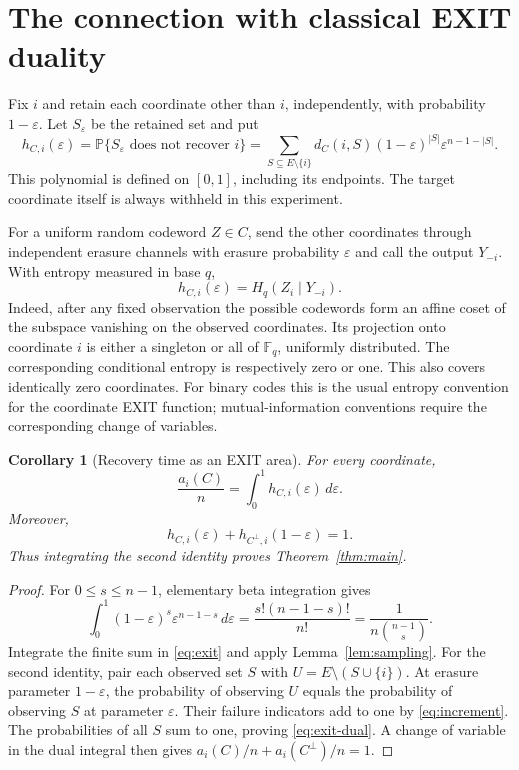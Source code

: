 \documentclass[11pt]{article}
\newtheorem{corollary}[theorem]{Corollary}
\theoremstyle{remark}
\newcommand{\F}{\mathbb F}
\newcommand{\Prob}{\mathbb P}
\begin{document}
\section{The connection with classical EXIT duality}\label{sec:exit}
Fix $i$ and retain each coordinate other than $i$, independently, with
probability $1-\varepsilon$. Let $S_\varepsilon$ be the retained set and put
\begin{equation}\label{eq:exit}
 h_{C,i}(\varepsilon)
 =\Prob\{S_\varepsilon\text{ does not recover }i\}
 =\sum_{S\subseteq E\setminus\{i\}}
 d_C(i,S)(1-\varepsilon)^{|S|}\varepsilon^{n-1-|S|}.
\end{equation}
This polynomial is defined on $[0,1]$, including its endpoints. The target
coordinate itself is always withheld in this experiment.

For a uniform random codeword $Z\in C$, send the other coordinates through
independent erasure channels with erasure probability $\varepsilon$ and
call the output $Y_{-i}$. With entropy measured in base $q$,
\[
                 h_{C,i}(\varepsilon)=H_q(Z_i\mid Y_{-i}).
\]
Indeed, after any fixed observation the possible codewords form an affine
coset of the subspace vanishing on the observed coordinates. Its projection
onto coordinate $i$ is either a singleton or all of $\F_q$, uniformly
distributed. The corresponding conditional entropy is respectively zero
or one. This also covers identically zero coordinates. For binary codes
this is the usual entropy convention for the coordinate EXIT function;
mutual-information conventions require the corresponding change of variables.

\begin{corollary}[Recovery time as an EXIT area]\label{cor:exit}
For every coordinate,
\begin{equation}\label{eq:exit-area}
             \frac{a_i(C)}{n}=\int_0^1 h_{C,i}(\varepsilon)\,d\varepsilon.
\end{equation}
Moreover,
\begin{equation}\label{eq:exit-dual}
             h_{C,i}(\varepsilon)+h_{C^\perp,i}(1-\varepsilon)=1.
\end{equation}
Thus integrating the second identity proves Theorem~\ref{thm:main}.
\end{corollary}
\begin{proof}
For $0\leq s\leq n-1$, elementary beta integration gives
\[
 \int_0^1(1-\varepsilon)^s\varepsilon^{n-1-s}\,d\varepsilon
 =\frac{s!(n-1-s)!}{n!}=\frac{1}{n\binom{n-1}s}.
\]
Integrate the finite sum in \eqref{eq:exit} and apply
Lemma~\ref{lem:sampling}. For the second identity, pair each observed set
$S$ with $U=E\setminus(S\cup\{i\})$. At erasure parameter
$1-\varepsilon$, the probability of observing $U$ equals the probability
of observing $S$ at parameter $\varepsilon$. Their failure indicators add
to one by \eqref{eq:increment}. The probabilities of all $S$ sum to one,
proving \eqref{eq:exit-dual}. A change of variable in the dual integral
then gives $a_i(C)/n+a_i(C^\perp)/n=1$.
\end{proof}
\end{document}

